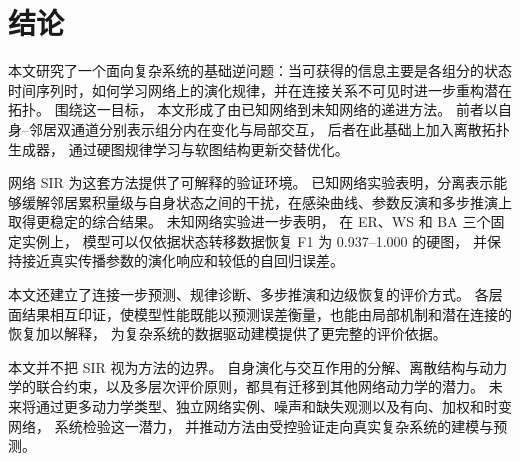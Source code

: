 \section{结论}

本文研究了一个面向复杂系统的基础逆问题：当可获得的信息主要是各组分的状态时间序列时，如何学习网络上的演化规律，并在连接关系不可见时进一步重构潜在拓扑。
围绕这一目标，
本文形成了由已知网络到未知网络的递进方法。
前者以自身--邻居双通道分别表示组分内在变化与局部交互，
后者在此基础上加入离散拓扑生成器，
通过硬图规律学习与软图结构更新交替优化。

网络 SIR 为这套方法提供了可解释的验证环境。
已知网络实验表明，分离表示能够缓解邻居累积量级与自身状态之间的干扰，在感染曲线、参数反演和多步推演上取得更稳定的综合结果。
未知网络实验进一步表明，
在 ER、WS 和 BA 三个固定实例上，
模型可以仅依据状态转移数据恢复 F1 为 0.937--1.000 的硬图，
并保持接近真实传播参数的演化响应和较低的自回归误差。

本文还建立了连接一步预测、规律诊断、多步推演和边级恢复的评价方式。
各层面结果相互印证，使模型性能既能以预测误差衡量，也能由局部机制和潜在连接的恢复加以解释，
为复杂系统的数据驱动建模提供了更完整的评价依据。

本文并不把 SIR 视为方法的边界。
自身演化与交互作用的分解、离散结构与动力学的联合约束，以及多层次评价原则，都具有迁移到其他网络动力学的潜力。
未来将通过更多动力学类型、独立网络实例、噪声和缺失观测以及有向、加权和时变网络，
系统检验这一潜力，
并推动方法由受控验证走向真实复杂系统的建模与预测。
